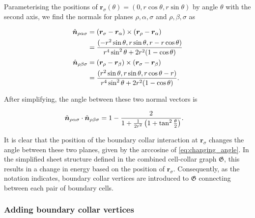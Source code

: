 Parameterising the positions of $\bm{r}_\sigma(\theta) = (0, r\cos\theta, r\sin\theta)$ by angle $\theta$ with the second axis, we find the normals for planes $\rho, \alpha, \sigma$ and $\rho, \beta, \sigma$ as 

\begin{align*}
	\hat{\bm{n}}_{\rho\alpha\sigma} &= (\bm{r}_\sigma - \bm{r}_\alpha) \times (\bm{r}_\rho - \bm{r}_\alpha) \\
	&= \frac{(-r^2 \sin\theta, r\sin\theta, r - r\cos\theta)}{r^4\sin^2\theta + 2r^2(1-\cos\theta)} \\
	\hat{\bm{n}}_{\rho\beta\sigma} &= (\bm{r}_{\rho} - \bm{r}_\beta) \times (\bm{r}_\sigma - \bm{r}_\beta)\\
	&= \frac{(r^2 \sin\theta, r\sin\theta, r\cos\theta - r)}{r^4\sin^2\theta + 2r^2(1-\cos\theta)}.
\end{align*}

\noindent After simplifying, the angle between these two normal vectors is 

\begin{align}
	\hat{\bm{n}}_{\rho\alpha\sigma} \cdot \hat{\bm{n}}_{\rho\beta\sigma} &= 1 - \frac{2}{1 + \frac{1}{2r^2} \left( 1 + \tan^2 \frac{\theta}{2}\right)}. \label{eq:changing_angle}
\end{align}

It is clear that the position of the boundary collar interaction at $\bm{r}_\sigma$ changes the angle between these two planes, given by the arccosine of \cref{eq:changing_angle}. In the simplified sheet structure defined in the combined cell-collar graph $\mathfrak{G}$, this results in a change in energy based on the position of $\bm{r}_\sigma$. Consequently, as the notation indicates, boundary collar vertices are introduced to $\mathfrak{G}$ connecting between each pair of boundary cells.

\subsubsection{Adding boundary collar vertices}

